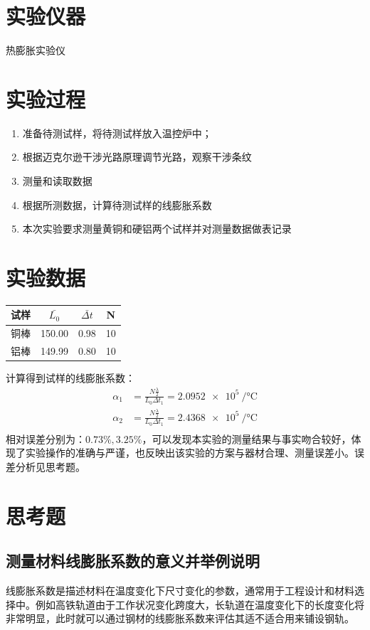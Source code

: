 \documentclass[a4paper,utf8]{article}
\begin{document}
\section{实验仪器}%
    热膨胀实验仪
\section{实验过程}%
    \begin{enumerate}
        \item 准备待测试样，将待测试样放入温控炉中；
        \item 根据迈克尔逊干涉光路原理调节光路，观察干涉条纹
        \item 测量和读取数据
        \item 根据所测数据，计算待测试样的线膨胀系数
        \item 本次实验要求测量黄铜和硬铝两个试样并对测量数据做表记录         
    \end{enumerate}
\section{实验数据}
    \begin{table}[!ht]
        \centering
        \begin{tabular}{|c|c|c|c|}
        \hline
            试样 & $\bar{L_0}$ & $\bar{\Delta t}$ & N \\ \hline
            铜棒 & 150.00 & 0.98 & 10 \\ 
            铝棒 & 149.99 & 0.80 & 10 \\ \hline
        \end{tabular}
    \end{table}
    计算得到试样的线膨胀系数：
    \begin{align*}
        \alpha_1 & =\frac{N\frac\lambda2}{L_0 {\Delta t}_1}=\num{2.0952e5}~\unit{\per\degreeCelsius}\\
        \alpha_2 & =\frac{N\frac\lambda2}{L_0 {\Delta t}_1}=\num{2.4368e5}~\unit{\per\degreeCelsius}\\
    \end{align*}
    相对误差分别为：$0.73 \%,3.25\%$，可以发现本实验的测量结果与事实吻合较好，体现了实验操作的准确与严谨，也反映出该实验的方案与器材合理、测量误差小。误差分析见思考题。
\section{思考题}
    \subsection{测量材料线膨胀系数的意义并举例说明} 
    线膨胀系数是描述材料在温度变化下尺寸变化的参数，通常用于工程设计和材料选择中。例如高铁轨道由于工作状况变化跨度大，长轨道在温度变化下的长度变化将非常明显，此时就可以通过钢材的线膨胀系数来评估其适不适合用来铺设钢轨。
\end{document}
